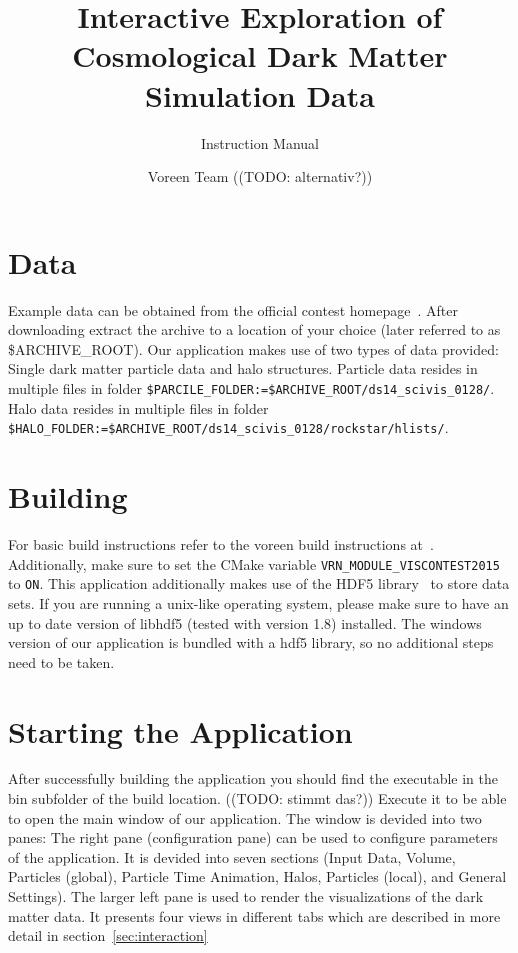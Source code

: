 \documentclass[
    fontsize=12pt,
    paper=a4,
    pagesize=auto,
    parskip=false,
    titlepage=on,
    english
]{scrartcl}
\title{Interactive Exploration of Cosmological Dark Matter Simulation Data}
\subtitle{Instruction Manual}
\author{Voreen Team ((TODO: alternativ?))}
\newcommand{\inlinecode}{\texttt}
\begin{document}
\maketitle

\newpage
\tableofcontents

\newpage

\section{Data}
\label{sec:data}
Example data can be obtained from the official contest homepage~\cite{contesthp}.
After downloading extract the archive to a location of your choice (later referred to as \$ARCHIVE\_ROOT).
Our application makes use of two types of data provided: Single dark matter particle data and halo structures.
Particle data resides in multiple files in folder \inlinecode{\$PARCILE\_FOLDER:=\$ARCHIVE\_ROOT/ds14\_scivis\_0128/}.
Halo data resides in multiple files in folder \inlinecode{\$HALO\_FOLDER:=\$ARCHIVE\_ROOT/ds14\_scivis\_0128/rockstar/hlists/}.

\section{Building}
For basic build instructions refer to the voreen build instructions at~\cite{voreen-build}.
Additionally, make sure to set the CMake variable \inlinecode{VRN\_MODULE\_VISCONTEST2015} to \inlinecode{ON}.
This application additionally makes use of the HDF5 library~\cite{hdf5lib} to store data sets.
If you are running a unix-like operating system, please make sure to have an up to date version of libhdf5 (tested with version 1.8) installed.
The windows version of our application is bundled with a hdf5 library, so no additional steps need to be taken.

\section{Starting the Application}
\label{sec:start}
After successfully building the application you should find the executable in the bin subfolder of the build location. ((TODO: stimmt das?))
Execute it to be able to open the main window of our application.
The window is devided into two panes:
The right pane (configuration pane) can be used to configure parameters of the application.
It is devided into seven sections (Input Data, Volume, Particles (global), Particle Time Animation, Halos, Particles (local), and General Settings).
The larger left pane is used to render the visualizations of the dark matter data.
It presents four views in different tabs which are described in more detail in section~\ref{sec:interaction}
\end{document}
